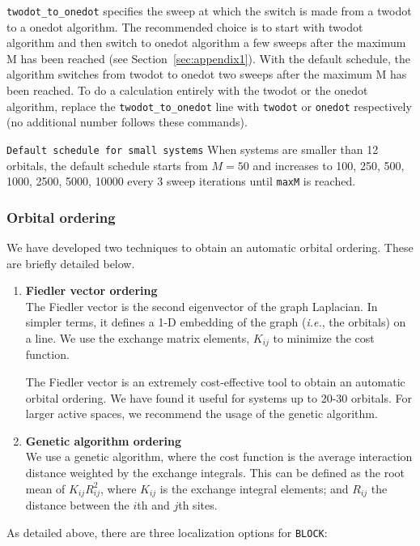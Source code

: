 \documentclass[letterpaper,12pt,aps, pra]{revtex4-1}
\begin{document}
\texttt{twodot\_to\_onedot} specifies the sweep at which the switch is made
from a twodot to a onedot algorithm. The recommended choice is to start with
twodot algorithm and then switch to onedot algorithm a few sweeps after the
maximum M has been reached (see Section~\ref{sec:appendix1}).  With the default
schedule, the algorithm switches from twodot to onedot two sweeps after the
maximum M has been reached.  To do a calculation entirely with the twodot or
the onedot algorithm, replace the \texttt{twodot\_to\_onedot} line with
\texttt{twodot} or \texttt{onedot} respectively (no additional number follows
these commands). 

\texttt{Default schedule for small systems} When systems are smaller than 12 orbitals, the default schedule starts from $M=50$ and increases to 100, 250, 500, 1000, 2500, 5000, 10000 every 3 sweep iterations until \texttt{maxM} is reached.

\subsubsection{Orbital ordering}

We have developed two techniques to obtain
an automatic orbital ordering. These are briefly detailed below. 

\begin{enumerate}
	\item \textbf{Fiedler vector ordering}\\
The Fiedler vector is the second eigenvector of the graph Laplacian. In
simpler terms, it defines a 1-D embedding of the graph (\textit{i.e.}, the
orbitals) on a line. We use the exchange matrix elements, $K_{ij}$ to minimize
the cost function.

The Fiedler vector is an extremely cost-effective tool to obtain an automatic
orbital ordering. We have found it useful for systems up to 20-30 orbitals.
For larger active spaces, we recommend the usage of the genetic algorithm.

\item \textbf{Genetic algorithm ordering} \\
We use a genetic algorithm, where the cost function is the average interaction
distance weighted by the exchange integrals. This can be defined as the root
mean of $K_{ij}R_{ij}^{2}$, where $K_{ij}$ is the exchange integral elements;
and $R_{ij}$ the distance between the $i$th and $j$th sites.
\end{enumerate}

As detailed above, there are three localization options for \texttt{BLOCK}:
\end{document}
